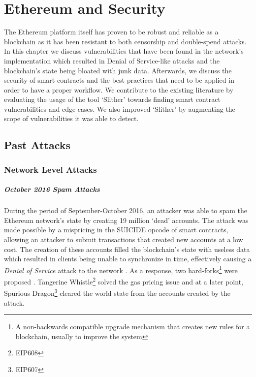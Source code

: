 \chapter{Ethereum and Security} \label{ch:security}

The Ethereum platform itself has proven to be robust and reliable as a blockchain as it has been resistant to both censorship and double-spend attacks. In this chapter we discuss vulnerabilities that have been found in the network's implementation which resulted in Denial of Service-like attacks and the blockchain's state being bloated with junk data. Afterwards, we discuss the security of smart contracts and the best practices that need to be applied in order to have a proper workflow. We contribute to the existing literature by evaluating the usage of the tool `Slither' towards finding smart contract vulnerabilities and edge cases. We also improved `Slither' by augmenting the scope of vulnerabilities it was able to detect.

\section{Past Attacks}
\subsection{Network Level Attacks}

\paragraph{October 2016 Spam Attacks}
During the period of September-October 2016, an attacker was able to spam the Ethereum network's state by creating 19 million `dead' accounts. The attack was made possible by a mispricing in the SUICIDE opcode of smart contracts, allowing an attacker to submit transactions that created new accounts at a low cost. The creation of these accounts filled the blockchain's state with useless data which resulted in clients being unable to synchronize in time, effectively causing a \textit{Denial of Service} attack to the network \cite{eip150faq}. As a response, two hard-forks\footnote{A non-backwards compatible upgrade mechanism that creates new rules for a blockchain, usually to improve the system} were proposed \cite{eip607, eip608}. Tangerine Whistle\footnote{EIP608} solved the gas pricing issue and at a later point, Spurious Dragon\footnote{EIP607} cleared the world state from the accounts created by the attack. 

